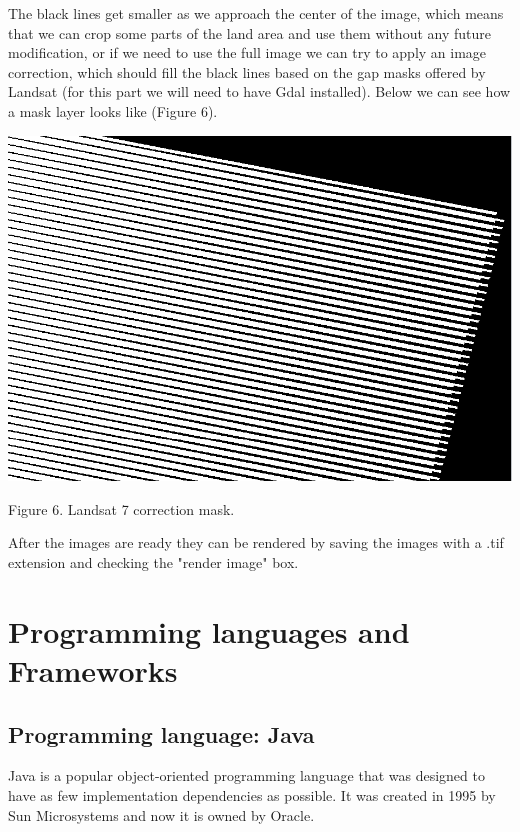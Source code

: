 \documentclass[12pt, a4paper]{report}
\begin{document}
\quad
The black lines get smaller as we approach the center of the image, which means that we can crop some parts of the land area and use them without any future modification, or if we need to use the full image we can try to apply an image correction, which should fill the black lines based on the gap masks offered by Landsat (for this part we will need to have Gdal installed). Below we can see how a mask layer looks like (Figure 6).
\par 


\bigskip

\includegraphics[scale=0.54, center]{landsat_black_stripes_correction.png} 
\begin{center}
Figure 6. Landsat 7 correction mask.
\end{center}
\par 

After the images are ready they can be rendered by saving the images with a .tif extension and checking the "render image" box.



\section{Programming languages and Frameworks} 

\subsection{Programming language: Java}
\medskip

\quad
Java is a popular object-oriented programming language that was designed to have as few implementation dependencies as possible. It was created in 1995 by Sun Microsystems and now it is owned by Oracle.
\par
\end{document}

